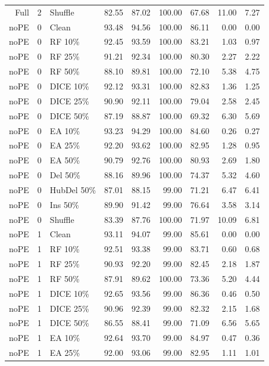 {\begin{longtable}{rllrrrrrr}
Full & 2 & Shuffle & 82.55 & 87.02 & 100.00 & 67.68 & 11.00 & 7.27 \\
noPE & 0 & Clean & 93.48 & 94.56 & 100.00 & 86.11 & 0.00 & 0.00 \\
noPE & 0 & RF 10\% & 92.45 & 93.59 & 100.00 & 83.21 & 1.03 & 0.97 \\
noPE & 0 & RF 25\% & 91.21 & 92.34 & 100.00 & 80.30 & 2.27 & 2.22 \\
noPE & 0 & RF 50\% & 88.10 & 89.81 & 100.00 & 72.10 & 5.38 & 4.75 \\
noPE & 0 & DICE 10\% & 92.12 & 93.31 & 100.00 & 82.83 & 1.36 & 1.25 \\
noPE & 0 & DICE 25\% & 90.90 & 92.11 & 100.00 & 79.04 & 2.58 & 2.45 \\
noPE & 0 & DICE 50\% & 87.19 & 88.87 & 100.00 & 69.32 & 6.30 & 5.69 \\
noPE & 0 & EA 10\% & 93.23 & 94.29 & 100.00 & 84.60 & 0.26 & 0.27 \\
noPE & 0 & EA 25\% & 92.20 & 93.62 & 100.00 & 82.95 & 1.28 & 0.95 \\
noPE & 0 & EA 50\% & 90.79 & 92.76 & 100.00 & 80.93 & 2.69 & 1.80 \\
noPE & 0 & Del 50\% & 88.16 & 89.96 & 100.00 & 74.37 & 5.32 & 4.60 \\
noPE & 0 & HubDel 50\% & 87.01 & 88.15 & 99.00 & 71.21 & 6.47 & 6.41 \\
noPE & 0 & Ins 50\% & 89.90 & 91.42 & 99.00 & 76.64 & 3.58 & 3.14 \\
noPE & 0 & Shuffle & 83.39 & 87.76 & 100.00 & 71.97 & 10.09 & 6.81 \\
noPE & 1 & Clean & 93.11 & 94.07 & 99.00 & 85.61 & 0.00 & 0.00 \\
noPE & 1 & RF 10\% & 92.51 & 93.38 & 99.00 & 83.71 & 0.60 & 0.68 \\
noPE & 1 & RF 25\% & 90.93 & 92.20 & 99.00 & 82.45 & 2.18 & 1.87 \\
noPE & 1 & RF 50\% & 87.91 & 89.62 & 100.00 & 73.36 & 5.20 & 4.44 \\
noPE & 1 & DICE 10\% & 92.65 & 93.56 & 99.00 & 86.36 & 0.46 & 0.50 \\
noPE & 1 & DICE 25\% & 90.96 & 92.39 & 99.00 & 82.32 & 2.15 & 1.68 \\
noPE & 1 & DICE 50\% & 86.55 & 88.41 & 99.00 & 71.09 & 6.56 & 5.65 \\
noPE & 1 & EA 10\% & 92.64 & 93.70 & 99.00 & 84.97 & 0.47 & 0.36 \\
noPE & 1 & EA 25\% & 92.00 & 93.06 & 99.00 & 82.95 & 1.11 & 1.01 \\

\end{longtable}}
